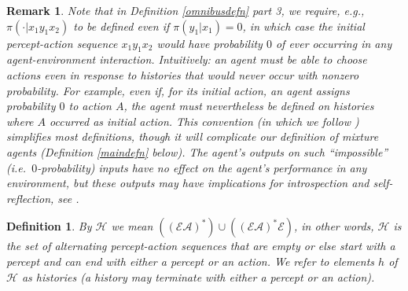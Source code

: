 \documentclass[twoside]{article}
\newtheorem{definition}[theorem]{Definition}
\newtheorem{remark}[theorem]{Remark}
\begin{document}
\begin{remark}
\label{impossibleremark}
    Note that in Definition \ref{omnibusdefn} part 3, we require,
    e.g., $\pi(\cdot|x_1y_1x_2)$ to be defined even if
    $\pi(y_1|x_1)=0$, in which case the initial percept-action sequence $x_1y_1x_2$
    would have probability $0$ of ever occurring in any agent-environment
    interaction. Intuitively: an agent must be able to choose actions even
    in response to histories that would never occur with nonzero probability.
    For example, even if, for its initial action, an agent assigns
    probability $0$ to action $A$, the agent must nevertheless
    be defined on histories where $A$ occurred as initial action.
    This convention (in which we follow \cite{legg2007universal}) simplifies most
    definitions, though it will complicate our definition of mixture agents
    (Definition \ref{maindefn} below). The agent's outputs on such
    ``impossible'' (i.e.\ $0$-probability) inputs have no effect on the agent's performance
    in any environment, but these outputs may have implications for introspection
    and self-reflection, see \cite{extendedenvironmentspaper}.
\end{remark}

\begin{definition}
    By $\mathcal H$ we mean
    $((\mathcal E\mathcal A)^*)\cup((\mathcal E\mathcal A)^*\mathcal E)$,
    in other words, $\mathcal H$ is the set of alternating percept-action
    sequences that are empty or else start with a percept and can end with
    either a percept or an action.
    We refer to elements $h$ of $\mathcal H$ as \emph{histories} (a history
    may terminate with either a percept or an action).
\end{definition}
\end{document}
